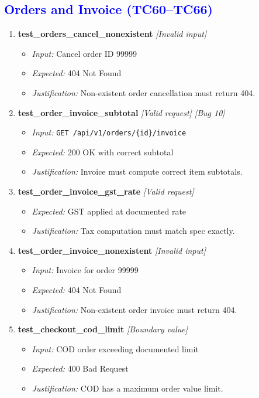 \documentclass{article}
\begin{document}
\subsection*{\textcolor{blue}{Orders and Invoice (TC60--TC66)}}
\begin{enumerate}[resume, label=\textbf{TC\arabic*.}]

\item \textbf{test\_orders\_cancel\_nonexistent} \textit{[Invalid input]}
\begin{itemize}[noitemsep]
  \item \textit{Input:} Cancel order ID 99999
  \item \textit{Expected:} 404 Not Found
  \item \textit{Justification:} Non-existent order cancellation must return 404.
\end{itemize}

\item \textbf{test\_order\_invoice\_subtotal} \textit{[Valid request] \textit{[Bug 10]}}
\begin{itemize}[noitemsep]
  \item \textit{Input:} \texttt{GET /api/v1/orders/\{id\}/invoice}
  \item \textit{Expected:} 200 OK with correct subtotal
  \item \textit{Justification:} Invoice must compute correct item subtotals.
\end{itemize}

\item \textbf{test\_order\_invoice\_gst\_rate} \textit{[Valid request]}
\begin{itemize}[noitemsep]
  \item \textit{Expected:} GST applied at documented rate
  \item \textit{Justification:} Tax computation must match spec exactly.
\end{itemize}

\item \textbf{test\_order\_invoice\_nonexistent} \textit{[Invalid input]}
\begin{itemize}[noitemsep]
  \item \textit{Input:} Invoice for order 99999
  \item \textit{Expected:} 404 Not Found
  \item \textit{Justification:} Non-existent order invoice must return 404.
\end{itemize}

\item \textbf{test\_checkout\_cod\_limit} \textit{[Boundary value]}
\begin{itemize}[noitemsep]
  \item \textit{Input:} COD order exceeding documented limit
  \item \textit{Expected:} 400 Bad Request
  \item \textit{Justification:} COD has a maximum order value limit.
\end{itemize}


\end{enumerate}
\end{document}
